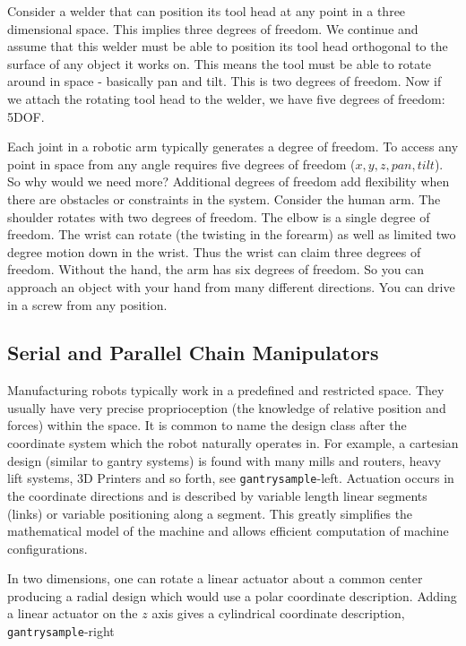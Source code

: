Consider a welder that can position its tool head at any point in a
three dimensional space. This implies three degrees of freedom. We
continue and assume that this welder must be able to position its tool
head orthogonal to the surface of any object it works on. This means the
tool must be able to rotate around in space - basically pan and tilt.
This is two degrees of freedom. Now if we attach the rotating tool head
to the welder, we have five degrees of freedom: 5DOF.

Each joint in a robotic arm typically generates a degree of freedom. To
access any point in space from any angle requires five degrees of
freedom (\(x,y,z,pan,tilt\)). So why would we need more? Additional
degrees of freedom add flexibility when there are obstacles or
constraints in the system. Consider the human arm. The shoulder rotates
with two degrees of freedom. The elbow is a single degree of freedom.
The wrist can rotate (the twisting in the forearm) as well as limited
two degree motion down in the wrist. Thus the wrist can claim three
degrees of freedom. Without the hand, the arm has six degrees of
freedom. So you can approach an object with your hand from many
different directions. You can drive in a screw from any position.

\hypertarget{serial-and-parallel-chain-manipulators}{%
\subsection{Serial and Parallel Chain
Manipulators}\label{serial-and-parallel-chain-manipulators}}

Manufacturing robots typically work in a predefined and restricted
space. They usually have very precise proprioception (the knowledge of
relative position and forces) within the space. It is common to name the
design class after the coordinate system which the robot naturally
operates in. For example, a cartesian design (similar to gantry systems)
is found with many mills and routers, heavy lift systems, 3D Printers
and so forth, see \texttt{gantrysample}-left. Actuation occurs in the
coordinate directions and is described by variable length linear
segments (links) or variable positioning along a segment. This greatly
simplifies the mathematical model of the machine and allows efficient
computation of machine configurations.

In two dimensions, one can rotate a linear actuator about a common
center producing a radial design which would use a polar coordinate
description. Adding a linear actuator on the \(z\) axis gives a
cylindrical coordinate description, \texttt{gantrysample}-right

